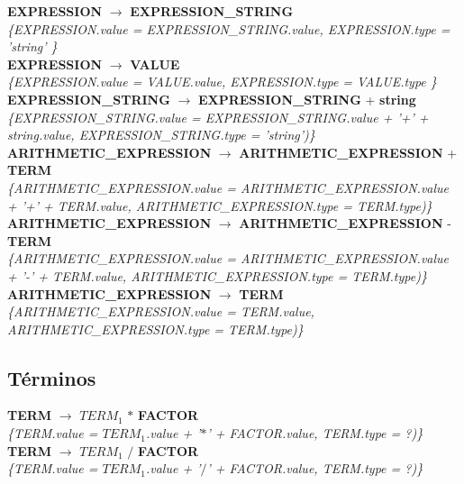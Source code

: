 \documentclass[10pt,a4paper]{article}
\begin{document}
\textbf{EXPRESSION} $\rightarrow$ \textbf{EXPRESSION\_STRING} \\
\textit{\{EXPRESSION.value =  EXPRESSION\_STRING.value, EXPRESSION.type = 'string' \}}  \\ 

\textbf{EXPRESSION} $\rightarrow$ \textbf{VALUE} \\
\textit{\{EXPRESSION.value =  VALUE.value, EXPRESSION.type = VALUE.type \}} \\

\textbf{EXPRESSION\_STRING} $\rightarrow$ \textbf{EXPRESSION\_STRING} + \textbf{string} \\ \textit{\{EXPRESSION\_STRING.value =  EXPRESSION\_STRING.value + '+' + string.value, EXPRESSION\_STRING.type = 'string')\}} \\

\textbf{ARITHMETIC\_EXPRESSION} $\rightarrow$ \textbf{ARITHMETIC\_EXPRESSION} + \textbf{TERM} \\
\textit{\{ARITHMETIC\_EXPRESSION.value =  ARITHMETIC\_EXPRESSION.value + '+' + TERM.value, ARITHMETIC\_EXPRESSION.type = TERM.type)\}} \\

\textbf{ARITHMETIC\_EXPRESSION} $\rightarrow$ \textbf{ARITHMETIC\_EXPRESSION} - \textbf{TERM}  \\
\textit{\{ARITHMETIC\_EXPRESSION.value =  ARITHMETIC\_EXPRESSION.value + '-' + TERM.value, ARITHMETIC\_EXPRESSION.type = TERM.type)\}} \\

\textbf{ARITHMETIC\_EXPRESSION} $\rightarrow$ \textbf{TERM} \\
\textit{\{ARITHMETIC\_EXPRESSION.value = TERM.value, ARITHMETIC\_EXPRESSION.type = TERM.type)\}}  \\

\subsection{Términos}
\textbf{TERM} $\rightarrow$ \textbf{$TERM_{1}$} $*$ \textbf{FACTOR}   \\
\textit{\{TERM.value = $TERM_{1}$.value + '$*$' + FACTOR.value, TERM.type = ?)\}} \\

\textbf{TERM} $\rightarrow$ \textbf{$TERM_{1}$} $/$ \textbf{FACTOR}   \\
\textit{\{TERM.value = $TERM_{1}$.value + '$/$' + FACTOR.value, TERM.type = ?)\}} \\
\end{document}
